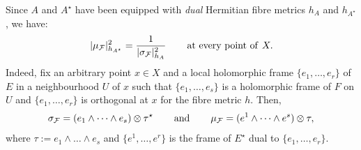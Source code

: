 \documentclass[12pt]{article}
\begin{document}
Since $A$ and $A^\star$ have been equipped with {\it dual} Hermitian fibre metrics $h_A$ and $h_{A^\star}$, we have: \begin{eqnarray}\label{eqn:norms_mu-sigma}|\mu_{\cal F}|_{h_{A^\star}}^2 = \frac{1}{|\sigma_{\cal F}|_{h_A}^2}  \hspace{5ex} \mbox{at every point of}\hspace{1ex} X.\end{eqnarray} Indeed, fix an arbitrary point $x\in X$ and a local holomorphic frame $\{e_1,\dots , e_r\}$ of $E$ in a neighbourhood $U$ of $x$ such that $\{e_1,\dots , e_s\}$ is a holomorphic frame of $F$ on $U$ and $\{e_1,\dots , e_r\}$ is orthogonal at $x$ for the fibre metric $h$. Then, \begin{eqnarray*}\sigma_{\cal F} = (e_1\wedge\dots \wedge e_s)\otimes\tau^\star \hspace{5ex} \mbox{and} \hspace{5ex} \mu_{\cal F} = (e^1\wedge\dots \wedge e^s)\otimes\tau,\end{eqnarray*} where $\tau:=e_1\wedge\dots \wedge e_s$ and $\{e^1,\dots , e^r\}$ is the frame of $E^\star$ dual to $\{e_1,\dots , e_r\}$.
\end{document}
